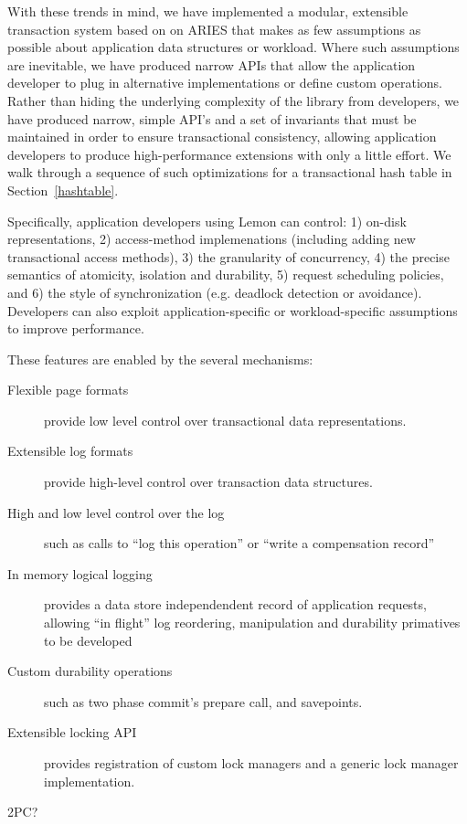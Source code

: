 \documentclass[letterpaper,twocolumn,english]{article}
\newcommand{\yad}{Lemon\xspace}
\begin{document}
With these trends in mind, we have implemented a modular, extensible
transaction system based on on ARIES that makes as few assumptions as
possible about application data structures or workload. Where such
assumptions are inevitable, we have produced narrow APIs that allow
the application developer to plug in alternative implementations or
define custom operations. Rather than hiding the underlying complexity
of the library from developers, we have produced narrow, simple API's
and a set of invariants that must be maintained in order to ensure
transactional consistency, allowing application developers to produce
high-performance extensions with only a little effort.  We walk
through a sequence of such optimizations for a transactional hash
table in Section~\ref{hashtable}.

Specifically, application developers using \yad can control: 1)
on-disk representations, 2) access-method implemenations (including
adding new transactional access methods), 3) the granularity of
concurrency, 4) the precise semantics of atomicity, isolation and
durability, 5) request scheduling policies, and 6) the style of
synchronization (e.g. deadlock detection or avoidance).  Developers
can also exploit application-specific or workload-specific assumptions
to improve performance.

These features are enabled by the several mechanisms:
\begin{description}
\item[Flexible page formats] provide low level control over 
      transactional data representations.
\item[Extensible log formats] provide high-level control over
      transaction data structures.
\item [High and low level control over the log] such as calls to ``log this
      operation'' or ``write a compensation record''
\item [In memory logical logging] provides a data store independendent
      record of application requests, allowing ``in flight'' log
      reordering, manipulation and durability primatives to be
      developed
\item[Custom durability operations] such as two phase commit's
      prepare call, and savepoints.
\item[Extensible locking API] provides registration of custom lock managers
      and a generic lock manager implementation.
\item[2PC?]
\end{description}
\end{document}
